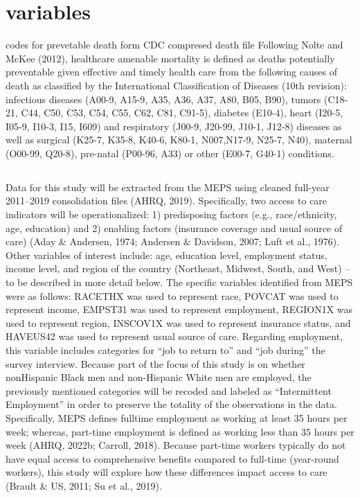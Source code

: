 \documentclass[../main.tex]{subfiles}
\begin{document}
\section{variables}

\cite{courtemanche_revisiting_2023}

codes for prevetable death form CDC compresed death file
Following Nolte and McKee (2012), healthcare amenable mortality is defined as deaths potentially preventable given effective and timely health care from the following causes of death as classified by the International Classification of Diseases (10th revision): infectious diseases (A00-9, A15-9, A35, A36, A37, A80, B05, B90), tumors (C18-21, C44, C50, C53, C54, C55, C62, C81, C91-5), diabetes (E10-4), heart (I20-5, I05-9, I10-3, I15, I609) and respiratory (J00-9, J20-99, J10-1, J12-8) diseases as well as surgical (K25-7, K35-8, K40-6, K80-1, N007,N17-9, N25-7, N40), maternal (O00-99, Q20-8), pre-natal (P00-96, A33) or other (E00-7, G40-1) conditions.



\subsection{}
Data for this study will be extracted from the MEPS using cleaned full-year
2011–2019 consolidation files (AHRQ, 2019). Specifically, two access to care indicators
will be operationalized: 1) predisposing factors (e.g., race/ethnicity, age, education) and
2) enabling factors (insurance coverage and usual source of care) (Aday \& Andersen,
1974; Andersen \& Davidson, 2007; Luft et al., 1976). Other variables of interest include:
age, education level, employment status, income level, and region of the country
(Northeast, Midwest, South, and West) – to be described in more detail below.
The specific variables identified from MEPS were as follows: RACETHX was
used to represent race, POVCAT was used to represent income, EMPST31 was used to
represent employment, REGION1X was used to represent region, INSCOV1X was used
to represent insurance status, and HAVEUS42 was used to represent usual source of care.
Regarding employment, this variable includes categories for “job to return to” and “job
during” the survey interview. Because part of the focus of this study is on whether nonHispanic Black men and non-Hispanic White men are employed, the previously
mentioned categories will be recoded and labeled as “Intermittent Employment” in order
to preserve the totality of the observations in the data. Specifically, MEPS defines fulltime employment as working at least 35 hours per week; whereas, part-time employment
is defined as working less than 35 hours per week (AHRQ, 2022b; Carroll, 2018).
Because part-time workers typically do not have equal access to comprehensive benefits
compared to full-time (year-round workers), this study will explore how these differences
impact access to care (Brault \& US, 2011; Su et al., 2019).
\end{document}

